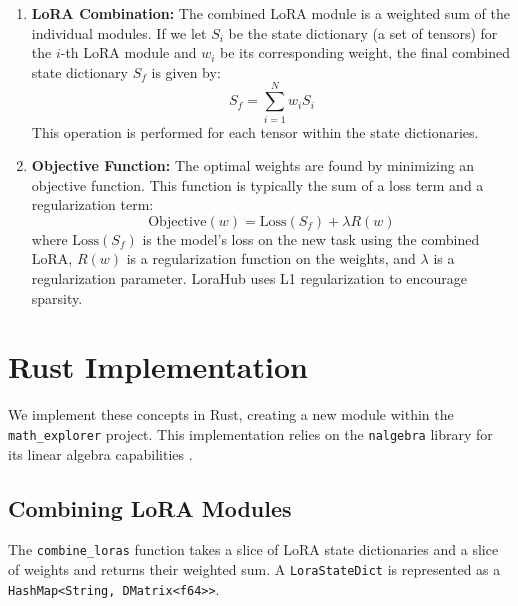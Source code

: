 \documentclass[12pt]{article}
\begin{document}
\begin{enumerate}
    \item \textbf{LoRA Combination:} The combined LoRA module is a weighted sum of the individual modules. If we let $S_i$ be the state dictionary (a set of tensors) for the $i$-th LoRA module and $w_i$ be its corresponding weight, the final combined state dictionary $S_f$ is given by:
    \begin{equation}
        S_f = \sum_{i=1}^{N} w_i S_i
    \end{equation}
    This operation is performed for each tensor within the state dictionaries.

    \item \textbf{Objective Function:} The optimal weights are found by minimizing an objective function. This function is typically the sum of a loss term and a regularization term:
    \begin{equation}
        \text{Objective}(w) = \text{Loss}(S_f) + \lambda R(w)
    \end{equation}
    where $\text{Loss}(S_f)$ is the model's loss on the new task using the combined LoRA, $R(w)$ is a regularization function on the weights, and $\lambda$ is a regularization parameter. LoraHub uses L1 regularization to encourage sparsity.
\end{enumerate}

\section{Rust Implementation}

We implement these concepts in Rust, creating a new module within the \texttt{math\_explorer} project. This implementation relies on the \texttt{nalgebra} library for its linear algebra capabilities \cite{nalgebra}.

\subsection{Combining LoRA Modules}

The \texttt{combine\_loras} function takes a slice of LoRA state dictionaries and a slice of weights and returns their weighted sum. A \texttt{LoraStateDict} is represented as a \texttt{HashMap<String, DMatrix<f64>>}.
\end{document}
